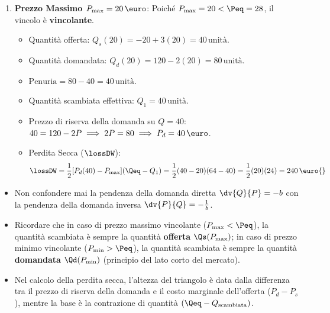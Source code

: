 \begin{esercizio}
\begin{enumerate}
    \item \textbf{Prezzo Massimo $P_{\max} = 20\,\text{\euro}$}:
    Poiché $P_{\max} = 20 < \Peq = 28$, il vincolo è \textbf{vincolante}.
    \begin{itemize}
        \item Quantità offerta: $Q_s(20) = -20 + 3(20) = 40\,\text{unità}$.
        \item Quantità domandata: $Q_d(20) = 120 - 2(20) = 80\,\text{unità}$.
        \item $\text{Penuria} = 80 - 40 = 40\,\text{unità}$.
        \item Quantità scambiata effettiva: $Q_1 = 40\,\text{unità}$.
        \item Prezzo di riserva della domanda su $Q=40$: $40 = 120 - 2P \implies 2P = 80 \implies P_d = 40\,\text{\euro}$.
        \item Perdita Secca ($\lossDW$):
        \begin{equation}
            \lossDW = \frac{1}{2} [P_d(40) - P_{\max}] (\Qeq - Q_1) = \frac{1}{2} (40 - 20) (64 - 40) = \frac{1}{2} (20) (24) = 240\,\text{\euro{}}
        \end{equation}
    \end{itemize}
\end{enumerate}
\end{esercizio}

\begin{esame}
\begin{itemize}
    \item Non confondere mai la pendenza della domanda diretta $\dv{Q}{P} = -b$ con la pendenza della domanda inversa $\dv{P}{Q} = -\frac{1}{b}$.
    \item Ricordare che in caso di prezzo massimo vincolante ($P_{\max} < \Peq$), la quantità scambiata è sempre la quantità \textbf{offerta} $\Qs(P_{\max})$; in caso di prezzo minimo vincolante ($P_{\min} > \Peq$), la quantità scambiata è sempre la quantità \textbf{domandata} $\Qd(P_{\min})$ (principio del lato corto del mercato).
    \item Nel calcolo della perdita secca, l'altezza del triangolo è data dalla differenza tra il prezzo di riserva della domanda e il costo marginale dell'offerta ($P_d - P_s$), mentre la base è la contrazione di quantità $(\Qeq - Q_{\text{scambiata}})$.
\end{itemize}
\end{esame}
